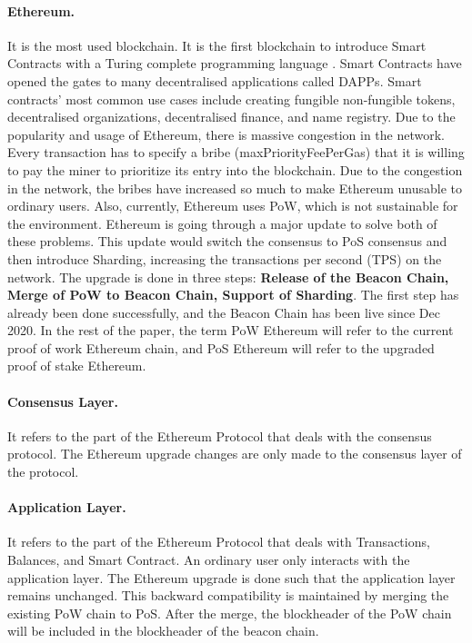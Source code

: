 \documentclass[a4paper,11pt,oneside]{article}
\theoremstyle{definition}
\begin{document}
  \paragraph{Ethereum.} It is the most used blockchain. It is the first blockchain to introduce Smart Contracts with a Turing complete programming language \cite{Ethereum}. Smart Contracts have opened the gates to many decentralised applications called DAPPs. Smart contracts' most common use cases include creating fungible non-fungible tokens, decentralised organizations, decentralised finance, and name registry. Due to the popularity and usage of Ethereum, there is massive congestion in the network. Every transaction has to specify a bribe (maxPriorityFeePerGas) that it is willing to pay the miner to prioritize its entry into the blockchain. Due to the congestion in the network, the bribes have increased so much to make Ethereum unusable to ordinary users. Also, currently, Ethereum uses PoW, which is not sustainable for the environment. Ethereum is going through a major update to solve both of these problems. This update would switch the consensus to PoS consensus and then introduce Sharding, increasing the transactions per second (TPS) on the network. The upgrade is done in three steps: \textbf{Release of the Beacon Chain, Merge of PoW to Beacon Chain, Support of Sharding}. The first step has already been done successfully, and the Beacon Chain has been live since Dec 2020. In the rest of the paper, the term PoW Ethereum will refer to the current proof of work Ethereum chain, and PoS Ethereum will refer to the upgraded proof of stake Ethereum.
  
  \paragraph{Consensus Layer.} It refers to the part of the Ethereum Protocol that deals with the consensus protocol. The Ethereum upgrade changes are only made to the consensus layer of the protocol. 
  
  \paragraph{Application Layer.} It refers to the part of the Ethereum Protocol that deals with Transactions, Balances, and Smart Contract. An ordinary user only interacts with the application layer. The Ethereum upgrade is done such that the application layer remains unchanged. This backward compatibility is maintained by merging the existing PoW chain to PoS. After the merge, the blockheader of the PoW chain will be included in the blockheader of the beacon chain.
  
\end{document}
